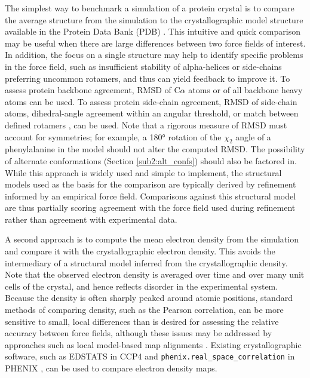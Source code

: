 \documentclass[9pt,review]{livecoms}
\begin{document}
The simplest way to benchmark a simulation of a protein crystal is to compare the average structure from the simulation to the crystallographic model structure available in the Protein Data Bank (PDB) \cite{bernstein_protein_1977,berman_protein_2000,rose_rcsb_2015}.
This intuitive and quick comparison may be useful when there are large differences between two force fields of interest.
In addition, the focus on a single structure may help to identify specific problems in the force field, such as insufficient stability of alpha-helices or side-chains preferring uncommon rotamers, and thus can yield feedback to improve it.
To assess protein backbone agreement, RMSD of C$\alpha$ atoms or of all backbone heavy atoms can be used.
To assess protein side-chain agreement, RMSD of side-chain atoms, dihedral-angle agreement within an angular threshold, or match between defined rotamers \cite{dunbrack_backbone-dependent_1993,lovell_penultimate_2000}, can be used.
Note that a rigorous measure of RMSD must account for symmetries; for example, a \ang{180} rotation of the $\chi_2$ angle of a phenylalanine in the model should not alter the computed RMSD.
The possibility of alternate conformations (Section \ref{sub2:alt_confs}) should also be factored in.
While this approach is widely used and simple to implement, the structural models used as the basis for the comparison are typically derived by refinement informed by an empirical force field.
Comparisons against this structural model are thus partially scoring agreement with the force field used during refinement rather than agreement with experimental data.

A second approach is to compute the mean electron density from the simulation \cite{grosse-kunstleve_computational_2002,wall_methods_2009,winn_overview_2011,case_amber_2022} and compare it with the crystallographic electron density.
This avoids the intermediary of a structural model inferred from the crystallographic density.
Note that the observed electron density is averaged over time and over many unit cells of the crystal, and hence reflects disorder in the experimental system.
Because the density is often sharply peaked around atomic positions, standard methods of comparing density, such as the Pearson correlation, can be more sensitive to small, local differences than is desired for assessing the relative accuracy between force fields, although these issues may be addressed by approaches such as local model-based map alignments \cite{pearce_multi-crystal_2017}.
Existing crystallographic software, such as EDSTATS in CCP4 \cite{winn_overview_2011} and \verb|phenix.real_space_correlation| in PHENIX \cite{liebschner_macromolecular_2019}, can be used to compare electron density maps.
\end{document}
